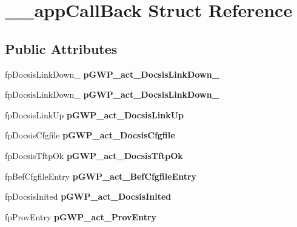 \hypertarget{struct____appCallBack}{
\section{\_\-\_\-appCallBack Struct Reference}
\label{struct____appCallBack}
}
\subsection*{Public Attributes}
\begin{DoxyCompactItemize}
\item 
\hypertarget{struct____appCallBack_ac511d9f6047bc5c1a85e401e29d2ac93}{
fpDocsisLinkDown\_ {\bfseries pGWP\_\-act\_\-DocsisLinkDown\_}}
\label{struct____appCallBack_ac511d9f6047bc5c1a85e401e29d2ac93}

\item 
\hypertarget{struct____appCallBack_a7fc4ab6913c33417c19b10344373b2cf}{
fpDocsisLinkDown\_ {\bfseries pGWP\_\-act\_\-DocsisLinkDown\_}}
\label{struct____appCallBack_a7fc4ab6913c33417c19b10344373b2cf}

\item 
\hypertarget{struct____appCallBack_aca67d2294bbdf8aa76e19d488c7794d7}{
fpDocsisLinkUp {\bfseries pGWP\_\-act\_\-DocsisLinkUp}}
\label{struct____appCallBack_aca67d2294bbdf8aa76e19d488c7794d7}

\item 
\hypertarget{struct____appCallBack_aabc23410a7d40d60b02f73c0dacba10e}{
fpDocsisCfgfile {\bfseries pGWP\_\-act\_\-DocsisCfgfile}}
\label{struct____appCallBack_aabc23410a7d40d60b02f73c0dacba10e}

\item 
\hypertarget{struct____appCallBack_a93a912ed58c146154e8c158dd508420f}{
fpDocsisTftpOk {\bfseries pGWP\_\-act\_\-DocsisTftpOk}}
\label{struct____appCallBack_a93a912ed58c146154e8c158dd508420f}

\item 
\hypertarget{struct____appCallBack_afbc2dc6c09a7e86e9c48d9146bc6e65c}{
fpBefCfgfileEntry {\bfseries pGWP\_\-act\_\-BefCfgfileEntry}}
\label{struct____appCallBack_afbc2dc6c09a7e86e9c48d9146bc6e65c}

\item 
\hypertarget{struct____appCallBack_a0b3a820bdb6f6aad4adc74e58ebdf878}{
fpDocsisInited {\bfseries pGWP\_\-act\_\-DocsisInited}}
\label{struct____appCallBack_a0b3a820bdb6f6aad4adc74e58ebdf878}

\item 
\hypertarget{struct____appCallBack_a777cbcb4ac4473d7ddb534f201d89456}{
fpProvEntry {\bfseries pGWP\_\-act\_\-ProvEntry}}
\label{struct____appCallBack_a777cbcb4ac4473d7ddb534f201d89456}


\end{DoxyCompactItemize}
